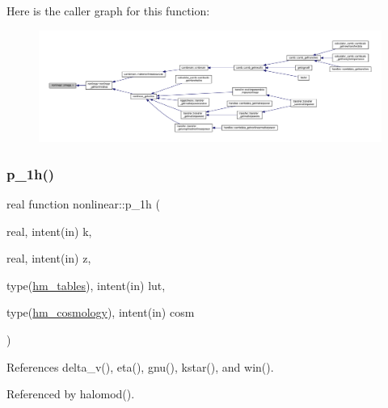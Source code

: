 Here is the caller graph for this function\+:
\nopagebreak
\begin{figure}[H]
\begin{center}
\leavevmode
\includegraphics[width=350pt]{namespacenonlinear_ab10a9f1bd96361d1619be7e609ce6cb5_icgraph}
\end{center}
\end{figure}
\mbox{\label{namespacenonlinear_a6734815086cf4dca34d8677f1d763e3f}} 
\subsubsection{\texorpdfstring{p\+\_\+1h()}{p\_1h()}}
{\footnotesize\ttfamily real function nonlinear\+::p\+\_\+1h (\begin{DoxyParamCaption}\item[{real, intent(in)}]{k,  }\item[{real, intent(in)}]{z,  }\item[{type(\mbox{\hyperlink{structnonlinear_1_1hm__tables}{hm\+\_\+tables}}), intent(in)}]{lut,  }\item[{type(\mbox{\hyperlink{structnonlinear_1_1hm__cosmology}{hm\+\_\+cosmology}}), intent(in)}]{cosm }\end{DoxyParamCaption})\hspace{0.3cm}{\ttfamily [private]}}



References delta\+\_\+v(), eta(), gnu(), kstar(), and win().



Referenced by halomod().

